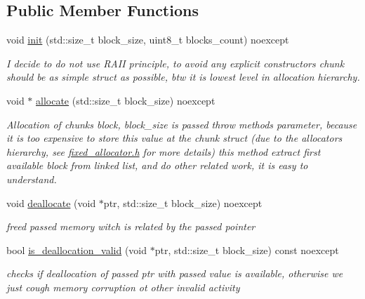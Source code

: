 \subsection*{Public Member Functions}
\begin{CompactItemize}
\item 
void \hyperlink{structhope_1_1memory_1_1final_4ceb422bbc652ee386c8458abc959425}{init} (std::size\_\-t block\_\-size, uint8\_\-t blocks\_\-count) noexcept
\begin{CompactList}\small\item\em I decide to do not use RAII principle, to avoid any explicit constructors chunk should be as simple struct as possible, btw it is lowest level in allocation hierarchy. \item\end{CompactList}\item 
void $\ast$ \hyperlink{structhope_1_1memory_1_1final_6b0b52dcc62d04aa1a8c3bb6168a7ce4}{allocate} (std::size\_\-t block\_\-size) noexcept
\begin{CompactList}\small\item\em Allocation of chunks block, block\_\-size is passed throw methods parameter, because it is too expensive to store this value at the chunk struct (due to the allocators hierarchy, see \hyperlink{fixed__allocator_8h-source}{fixed\_\-allocator.h} for more details) this method extract first available block from linked list, and do other related work, it is easy to understand. \item\end{CompactList}\item 
void \hyperlink{structhope_1_1memory_1_1final_9c7e918080a8c1429ec8d241e7dfe0cf}{deallocate} (void $\ast$ptr, std::size\_\-t block\_\-size) noexcept
\begin{CompactList}\small\item\em freed passed memory witch is related by the passed pointer \item\end{CompactList}\item 
bool \hyperlink{structhope_1_1memory_1_1final_180904dab84e90547c6664815c449416}{is\_\-deallocation\_\-valid} (void $\ast$ptr, std::size\_\-t block\_\-size) const noexcept
\begin{CompactList}\small\item\em checks if deallocation of passed ptr with passed value is available, otherwise we just cough memory corruption ot other invalid activity \item\end{CompactList}\item 

\end{CompactItemize}

